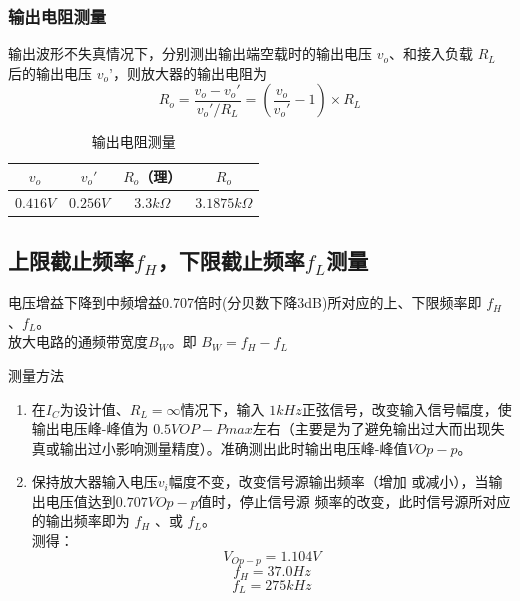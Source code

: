 \documentclass{../source/Experiment}
\begin{document}
            \subsubsection{输出电阻测量}
            输出波形不失真情况下，分别测出输出端空载时的输出电压 $v_o$、和接入负载 $R_L$ 后的输出电压 $v_o’$，则放大器的输出电阻为
            $$R_o = \frac{v_o - v_o'}{v_o'/R_L} = (\frac{v_o}{v_o'}-1)\times R_L$$
            \begin{table}[h]
                \centering
                \begin{tabular}{|c|c|c|c|}
                \hline
                $v_o$           & $v_o'$ & $R_o$（理） & $R_o$  \\ \hline
                $0.416V$ & $0.256V$  & $3.3k\Omega$ & $3.1875k\Omega$ \\ \hline
                \end{tabular}
                \caption{输出电阻测量}
            \end{table}
            \subsection{上限截止频率$f_H$，下限截止频率$f_L$测量}
            电压增益下降到中频增益0.707倍时(分贝数下降3dB)所对应的上、下限频率即 $f_H$、$f_L$。\\
            放大电路的通频带宽度$B_W$。即 $B_W = f_H - f_L$ \par
            测量方法
                \begin{enumerate}
                \item 在$I_C$为设计值、$R_L = \infty$情况下，输入	$1kHz$正弦信号，改变输入信号幅度，使输出电压峰-峰值为	$0.5V{OP-Pmax}$左右（主要是为了避免输出过大而出现失真或输出过小影响测量精度）。准确测出此时输出电压峰-峰值$VOp-p$。
                \item 保持放大器输入电压$v_i$幅度不变，改变信号源输出频率（增加	或减小），当输出电压值达到$0.707V{Op-p}$值时，停止信号源	频率的改变，此时信号源所对应的输出频率即为 $f_H$ 、或 $f_L$。\\
                测得：\\
                $$V_{Op-p} = 1.104V$$
                $$f_H = 37.0Hz$$
                $$f_L = 275kHz$$
                \end{enumerate}
\end{document}
